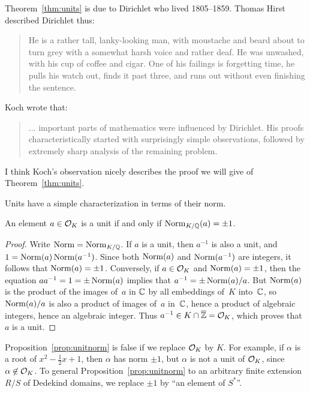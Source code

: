 \begin{remark}
Theorem~\ref{thm:units} is due to Dirichlet  who lived 1805--1859.
Thomas Hirst described Dirichlet thus:
\begin{quote}He is a rather tall, 
lanky-looking man, with moustache and beard about
to turn grey with a somewhat harsh voice and rather deaf. He was
unwashed, with his cup of coffee and cigar. One of his failings is
forgetting time, he pulls his watch out, finds it past three, and runs
out without even finishing the sentence.
\end{quote}
Koch wrote that:
\begin{quote}
... important parts of mathematics were influenced by Dirichlet. His
proofs characteristically started with surprisingly simple
observations, followed by extremely sharp analysis of the remaining
problem. 
\end{quote}
I think Koch's observation nicely describes the proof we will give of
Theorem~\ref{thm:units}.
\end{remark}



Units have a simple characterization in terms of their norm.
\begin{proposition}\label{prop:unitnorm}
An element $a\in \mathcal{O}_K$ is a unit if and only if $\operatorname{Norm}_{K/\mathbb{Q}}(a)=\pm 1$.
\end{proposition}
\begin{proof}
Write $\operatorname{Norm}=\operatorname{Norm}_{K/\mathbb{Q}}$.  If $a$ is a unit, then $a^{-1}$ is also a
unit, and $1=\operatorname{Norm}(a)\operatorname{Norm}(a^{-1})$.  Since both $\operatorname{Norm}(a)$ and
$\operatorname{Norm}(a^{-1})$ are integers, it follows that $\operatorname{Norm}(a)=\pm 1$.
Conversely, if $a\in \mathcal{O}_K$ and $\operatorname{Norm}(a)=\pm 1$, then the equation
$aa^{-1}=1=\pm \operatorname{Norm}(a)$ implies that $a^{-1} = \pm \operatorname{Norm}(a)/a$.  But
$\operatorname{Norm}(a)$ is the product of the images of~$a$ in $\mathbb{C}$ by all
embeddings of~$K$ into~$\mathbb{C}$, so $\operatorname{Norm}(a)/a$ is also a product of
images of~$a$ in~$\mathbb{C}$, hence a product of algebraic integers,
hence an algebraic integer.  Thus $a^{-1}\in K\cap \overline{\mathbb{Z}} = \mathcal{O}_K$, 
which proves that~$a$ is a unit.
\end{proof}

\begin{remark}
Proposition~\ref{prop:unitnorm} is false if we replace $\mathcal{O}_K$ by $K$.
For example, if $\alpha$ is a root of $x^2-\frac{1}{2}x+1$, then
$\alpha$ has norm $\pm 1$, but $\alpha$ is not a unit of $\mathcal{O}_K$, since
$\alpha\not\in \mathcal{O}_K$.  To general Proposition~\ref{prop:unitnorm} to an
arbitrary finite extension $R/S$ of Dedekind domains, we replace $\pm
1$ by ``an element of $S^*$''.
\end{remark}

